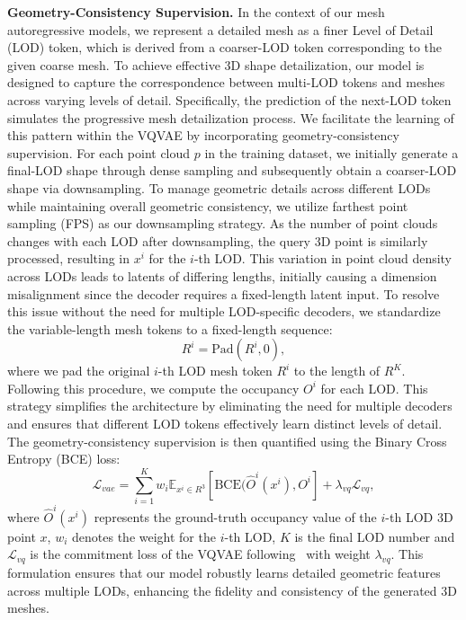 \noindent\textbf{Geometry-Consistency Supervision.}
In the context of our mesh autoregressive models, we represent a detailed mesh as a finer Level of Detail (LOD) token, which is derived from a coarser-LOD token corresponding to the given coarse mesh. To achieve effective 3D shape detailization, our model is designed to capture the correspondence between multi-LOD tokens and meshes across varying levels of detail. Specifically, the prediction of the next-LOD token simulates the progressive mesh detailization process. We facilitate the learning of this pattern within the VQVAE by incorporating geometry-consistency supervision. For each point cloud $p$ in the training dataset, we initially generate a final-LOD shape through dense sampling and subsequently obtain a coarser-LOD shape via downsampling.
To manage geometric details across different LODs while maintaining overall geometric consistency, we utilize farthest point sampling (FPS) as our downsampling strategy. As the number of point clouds changes with each LOD after downsampling, the query 3D point is similarly processed, resulting in $x^i$ for the $i$-th LOD. This variation in point cloud density across LODs leads to latents of differing lengths, initially causing a dimension misalignment since the decoder requires a fixed-length latent input. To resolve this issue without the need for multiple LOD-specific decoders, we standardize the variable-length mesh tokens to a fixed-length sequence: 
\begin{equation}
    R^i = \mathrm{Pad}(R^i, 0),
\end{equation}
where we pad the original $i$-th LOD mesh token $R^i$ to the length of $R^K$. Following this procedure, we compute the occupancy $O^i$ for each LOD. 
This strategy simplifies the architecture by eliminating the need for multiple decoders and ensures that different LOD tokens effectively learn distinct levels of detail. The geometry-consistency supervision is then quantified using the Binary Cross Entropy (BCE) loss:
\begin{equation}
    \mathcal{L}_{vae} = \sum_{i=1}^K w_i \mathbb{E}_{x^i\in R^3}[\mathrm{BCE}(\hat{O}^i(x^i),O^i] + \lambda_{vq}\mathcal{L}_{vq},
\end{equation}
where $\hat{O}^i(x^i)$ represents the ground-truth occupancy value of the $i$-th LOD 3D point $x$, $w_i$ denotes the weight for the $i$-th LOD, $K$ is the final LOD number and $\mathcal{L}_{vq}$ is the commitment loss of the VQVAE following~\cite{vqvae} with weight $\lambda_{vq}$. This formulation ensures that our model robustly learns detailed geometric features across multiple LODs, enhancing the fidelity and consistency of the generated 3D meshes.

